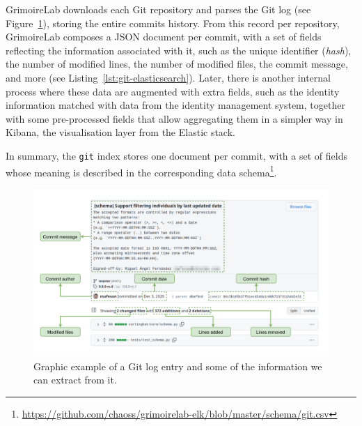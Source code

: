 \documentclass[a4paper, 12pt]{book}
\begin{document}
GrimoireLab downloads each Git repository and parses the Git log (see Figure~\ref{fig:example-commit-github}), storing the entire commits history. From this record per repository, GrimoireLab composes a JSON document per commit, with a set of fields reflecting the information associated with it, such as the unique identifier (\textit{hash}), the number of modified lines, the number of modified files, the commit message, and more (see Listing~\ref{lst:git-elasticsearch}). Later, there is another internal process where these data are augmented with extra fields, such as the identity information matched with data from the identity management system, together with some pre-processed fields that allow aggregating them in a simpler way in Kibana, the visualisation layer from the Elastic stack.

In summary, the \texttt{git} index stores one document per commit, with a set of fields whose meaning is described in the corresponding data schema\footnote{\url{https://github.com/chaoss/grimoirelab-elk/blob/master/schema/git.csv}}.

\begin{figure}
  \centering
  \includegraphics[width=16cm, keepaspectratio]{img/example-commit-mafesan.drawio.png}
  \caption{Graphic example of a Git log entry and some of the information we can extract from it.}
  \label{fig:example-commit-github}
\end{figure}
\end{document}
